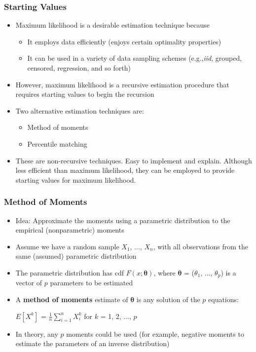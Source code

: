 \documentclass{beamer}
\begin{document}
\begin{frame}%
\frametitle{Starting Values}
\begin{itemize}
\item Maximum likelihood is a desirable estimation technique because
\begin{itemize}
\item It employs data efficiently (enjoys certain optimality properties)
\item It can be used in a variety of data sampling schemes (e.g.,\textit{iid}, grouped, censored, regression, and so forth)
\end{itemize}
\item However, maximum likelihood is a recursive estimation procedure that requires starting values to begin the recursion
\item Two alternative estimation techniques are:
\begin{itemize}
\item Method of moments
\item Percentile matching
\end{itemize}
\item These are non-recursive techniques. Easy to implement and explain. Although less efficient than maximum likelihood, they can be employed to provide starting values for maximum likelihood.
\end{itemize}
\end{frame}

\begin{frame}[shrink=2]
\frametitle{Method of Moments}
\begin{itemize}
\item Idea: Approximate the moments using a parametric distribution to the empirical (nonparametric)
moments \vspace{2mm}

\item Assume we have a random sample $X_1$, ..., $X_n$, with all observations from the
same (assumed) parametric distribution \vspace{2mm}

\item The parametric distribution has cdf $F(x;\mathbf{\theta})$, where $\mathbf{\theta}$ = ($\theta_1$, ..., $\theta_p$) is
a vector of $p$ parameters to be estimated \vspace{2mm}

\item A \textbf{method of moments} estimate of $\mathbf{\theta}$ is any solution of the $p$ equations: \vspace{2mm}

\hspace{1in} $E[X^k ]$ = $\frac{1}{n}\sum^n_{i =
1}X^k_i$ for $k$ = 1, 2, ..., $p$ \vspace{2mm}

\item In theory, any $p$ moments could be used (for example,
negative moments to estimate the parameters of an inverse
distribution)
\end{itemize}
\end{frame}
\end{document}
